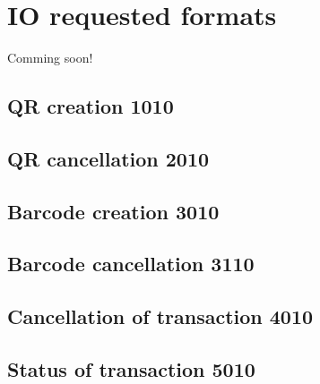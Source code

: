 \documentclass[12pt]{article}
\begin{document}
\section{IO requested formats }\label{results}
Comming soon!
\subsection{QR creation 1010}

\subsection{QR cancellation 2010}

\subsection{Barcode creation 3010}

\subsection{Barcode cancellation 3110}

\subsection{Cancellation of transaction 4010}

\subsection{Status of transaction 5010}




\begin{thebibliography}{9}
        
\end{thebibliography}
\end{document}
